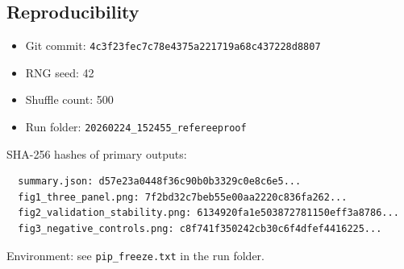 \subsection{Reproducibility}\label{app:repro}

\begin{itemize}
  \item Git commit: \texttt{4c3f23fec7c78e4375a221719a68c437228d8807}
  \item RNG seed: 42
  \item Shuffle count: 500
  \item Run folder: \texttt{20260224\_152455\_refereeproof}
\end{itemize}

SHA-256 hashes of primary outputs:
\begin{verbatim}
  summary.json: d57e23a0448f36c90b0b3329c0e8c6e5...
  fig1_three_panel.png: 7f2bd32c7beb55e00aa2220c836fa262...
  fig2_validation_stability.png: 6134920fa1e503872781150eff3a8786...
  fig3_negative_controls.png: c8f741f350242cb30c6f4dfef4416225...
\end{verbatim}

Environment: see \texttt{pip\_freeze.txt} in the run folder.